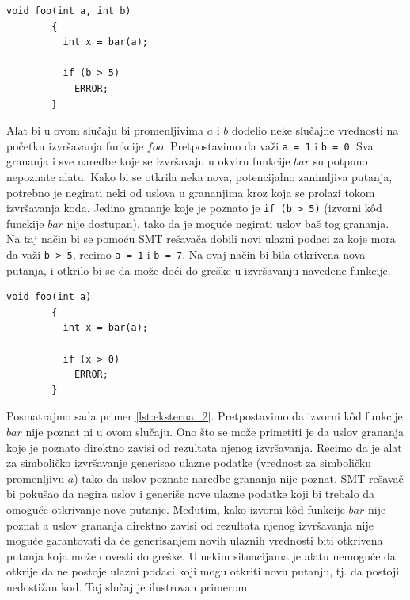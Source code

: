 \documentclass[12pt,oneside]{memoir}
\begin{document}
\bigbreak
    \begin{lstlisting}[caption={Primer gde rezultat izvršavanja eksterne funkcije nije važan},captionpos=b,label={lst:eksterna_1}]
        void foo(int a, int b)
        {
          int x = bar(a);
          
          if (b > 5)
            ERROR;
        }
    \end{lstlisting}
\bigbreak

Alat bi u ovom slučaju bi promenljivima $a$ i $b$ dodelio neke slučajne vrednosti na početku izvršavanja funkcije $foo$. Pretpostavimo da važi \texttt{a = 1} i \texttt{b = 0}. Sva grananja i sve naredbe koje se izvršavaju u okviru funkcije $bar$ su potpuno nepoznate alatu. Kako bi se otkrila neka nova, potencijalno zanimljiva putanja, potrebno je negirati neki od uslova u grananjima kroz koja se prolazi tokom izvršavanja koda. Jedino grananje koje je poznato je \texttt{if (b > 5)} (izvorni k\^od funckije $bar$ nije dostupan), tako da je moguće negirati uslov baš tog grananja. Na taj način bi se pomoću SMT rešavača dobili novi ulazni podaci za koje mora da važi \texttt{b > 5}, recimo \texttt{a = 1} i \texttt{b = 7}. Na ovaj način bi bila otkrivena nova putanja, i otkrilo bi se da može doći do greške u izvršavanju navedene funkcije.

\bigbreak
    \begin{lstlisting}[caption={Primer gde je rezultat izvršavanja eksterne funkcije važan},captionpos=b,label={lst:eksterna_2}]
        void foo(int a)
        {
          int x = bar(a);
          
          if (x > 0)
            ERROR;
        }
    \end{lstlisting}
\bigbreak

Posmatrajmo sada primer \ref{lst:eksterna_2}. Pretpostavimo da izvorni k\^od funkcije $bar$ nije poznat ni u ovom slučaju. Ono što se može primetiti je da uslov grananja koje je poznato direktno zavisi od rezultata njenog izvršavanja. Recimo da je alat za simboličko izvršavanje generisao ulazne podatke (vrednost za simboličku promenljivu $a$) tako da uslov poznate naredbe grananja nije poznat. SMT rešavač bi pokušao da negira uslov i generiše nove ulazne podatke koji bi trebalo da omoguće otkrivanje nove putanje. Međutim, kako izvorni k\^od funkcije $bar$ nije poznat a uslov grananja direktno zavisi od rezultata njenog izvršavanja nije moguće garantovati da će generisanjem novih ulaznih vrednosti biti otkrivena putanja koja može dovesti do greške. U nekim situacijama je alatu nemoguće da otkrije da ne postoje ulazni podaci koji mogu otkriti novu putanju, tj. da postoji nedostižan kod. Taj slučaj je ilustrovan primerom
\end{document}
